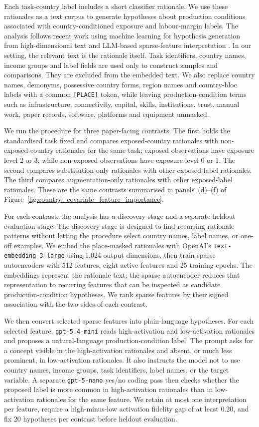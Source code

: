 \documentclass[11pt]{article}
\begin{document}
Each task-country label includes a short classifier rationale. We use these rationales as a text corpus to generate hypotheses about production conditions associated with country-conditioned exposure and labour-margin labels. The analysis follows recent work using machine learning for hypothesis generation from high-dimensional text and LLM-based sparse-feature interpretation \citep{LudwigMullainathan2024HypothesisGeneration,MovvaEtAl2025HypotheSAEs}. In our setting, the relevant text is the rationale itself. Task identifiers, country names, income groups and label fields are used only to construct samples and comparisons. They are excluded from the embedded text. We also replace country names, demonyms, possessive country forms, region names and country-bloc labels with a common \texttt{[PLACE]} token, while leaving production-condition terms such as infrastructure, connectivity, capital, skills, institutions, trust, manual work, paper records, software, platforms and equipment unmasked.

We run the procedure for three paper-facing contrasts. The first holds the standardised task fixed and compares exposed-country rationales with non-exposed-country rationales for the same task; exposed observations have exposure level 2 or 3, while non-exposed observations have exposure level 0 or 1. The second compares substitution-only rationales with other exposed-label rationales. The third compares augmentation-only rationales with other exposed-label rationales. These are the same contrasts summarised in panels~(d)--(f) of Figure~\ref{fig:country_covariate_feature_importance}.

For each contrast, the analysis has a discovery stage and a separate heldout evaluation stage. The discovery stage is designed to find recurring rationale patterns without letting the procedure select country names, label names, or one-off examples. We embed the place-masked rationales with OpenAI's \texttt{text-embedding-3-large} using 1{,}024 output dimensions, then train sparse autoencoders with 512 features, eight active features and 25 training epochs. The embeddings represent the rationale text; the sparse autoencoder reduces that representation to recurring features that can be inspected as candidate production-condition hypotheses. We rank sparse features by their signed association with the two sides of each contrast.

We then convert selected sparse features into plain-language hypotheses. For each selected feature, \texttt{gpt-5.4-mini} reads high-activation and low-activation rationales and proposes a natural-language production-condition label. The prompt asks for a concept visible in the high-activation rationales and absent, or much less prominent, in low-activation rationales. It also instructs the model not to use country names, income groups, task identifiers, label names, or the target variable. A separate \texttt{gpt-5-nano} yes/no coding pass then checks whether the proposed label is more common in high-activation rationales than in low-activation rationales for the same feature. We retain at most one interpretation per feature, require a high-minus-low activation fidelity gap of at least 0.20, and fix 20 hypotheses per contrast before heldout evaluation.
\end{document}
